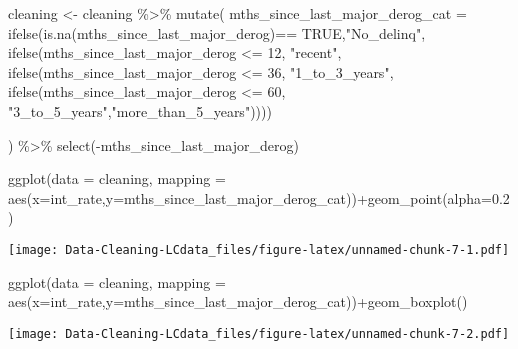\documentclass[
]{article}
\newenvironment{Shaded}{\begin{snugshade}}{\end{snugshade}}
\newcommand{\AttributeTok}[1]{\textcolor[rgb]{0.77,0.63,0.00}{#1}}
\newcommand{\ConstantTok}[1]{\textcolor[rgb]{0.00,0.00,0.00}{#1}}
\newcommand{\DecValTok}[1]{\textcolor[rgb]{0.00,0.00,0.81}{#1}}
\newcommand{\FloatTok}[1]{\textcolor[rgb]{0.00,0.00,0.81}{#1}}
\newcommand{\FunctionTok}[1]{\textcolor[rgb]{0.00,0.00,0.00}{#1}}
\newcommand{\NormalTok}[1]{#1}
\newcommand{\OtherTok}[1]{\textcolor[rgb]{0.56,0.35,0.01}{#1}}
\newcommand{\SpecialCharTok}[1]{\textcolor[rgb]{0.00,0.00,0.00}{#1}}
\newcommand{\StringTok}[1]{\textcolor[rgb]{0.31,0.60,0.02}{#1}}
\begin{document}
\begin{Shaded}
\begin{Highlighting}[]
\NormalTok{cleaning }\OtherTok{\textless{}{-}}\NormalTok{ cleaning }\SpecialCharTok{\%\textgreater{}\%} \FunctionTok{mutate}\NormalTok{(}
    \AttributeTok{mths\_since\_last\_major\_derog\_cat =} \FunctionTok{ifelse}\NormalTok{(}\FunctionTok{is.na}\NormalTok{(mths\_since\_last\_major\_derog)}\SpecialCharTok{==} \ConstantTok{TRUE}\NormalTok{,}\StringTok{"No\_delinq"}\NormalTok{, }
                                \FunctionTok{ifelse}\NormalTok{(mths\_since\_last\_major\_derog }\SpecialCharTok{\textless{}=} \DecValTok{12}\NormalTok{, }\StringTok{"recent"}\NormalTok{, }
                                   \FunctionTok{ifelse}\NormalTok{(mths\_since\_last\_major\_derog }\SpecialCharTok{\textless{}=} \DecValTok{36}\NormalTok{, }\StringTok{"1\_to\_3\_years"}\NormalTok{,}
                                          \FunctionTok{ifelse}\NormalTok{(mths\_since\_last\_major\_derog }\SpecialCharTok{\textless{}=} \DecValTok{60}\NormalTok{,     }\StringTok{"3\_to\_5\_years"}\NormalTok{,}\StringTok{"more\_than\_5\_years"}\NormalTok{)))) }
    
\NormalTok{  ) }\SpecialCharTok{\%\textgreater{}\%} \FunctionTok{select}\NormalTok{(}\SpecialCharTok{{-}}\NormalTok{mths\_since\_last\_major\_derog)}

\FunctionTok{ggplot}\NormalTok{(}\AttributeTok{data =}\NormalTok{ cleaning, }\AttributeTok{mapping =} \FunctionTok{aes}\NormalTok{(}\AttributeTok{x=}\NormalTok{int\_rate,}\AttributeTok{y=}\NormalTok{mths\_since\_last\_major\_derog\_cat))}\SpecialCharTok{+}\FunctionTok{geom\_point}\NormalTok{(}\AttributeTok{alpha=}\FloatTok{0.2}\NormalTok{)}
\end{Highlighting}
\end{Shaded}

\texttt{[image: Data-Cleaning-LCdata\_files/figure-latex/unnamed-chunk-7-1.pdf]}

\begin{Shaded}
\begin{Highlighting}[]
\FunctionTok{ggplot}\NormalTok{(}\AttributeTok{data =}\NormalTok{ cleaning, }\AttributeTok{mapping =} \FunctionTok{aes}\NormalTok{(}\AttributeTok{x=}\NormalTok{int\_rate,}\AttributeTok{y=}\NormalTok{mths\_since\_last\_major\_derog\_cat))}\SpecialCharTok{+}\FunctionTok{geom\_boxplot}\NormalTok{()}
\end{Highlighting}
\end{Shaded}

\texttt{[image: Data-Cleaning-LCdata\_files/figure-latex/unnamed-chunk-7-2.pdf]}
\end{document}
